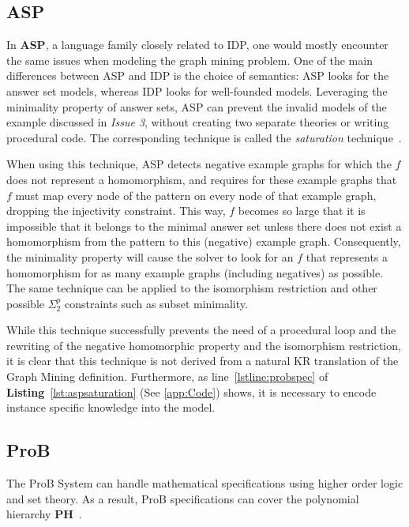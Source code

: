 \subsection{ASP}
In \textbf{ASP}, a language family closely related to IDP, one would mostly encounter the same issues when modeling the graph mining problem.
One of the main differences between ASP and IDP is the choice of semantics: ASP looks for the
answer set models, whereas IDP looks for well-founded models.
Leveraging the minimality property of answer sets, ASP can prevent the invalid models of the example discussed in \textit{Issue 3}, without creating two separate theories or writing procedural code.
The corresponding technique is called the \emph{saturation} technique~\citep{conf/rweb/EiterIK09}.

When using this technique, ASP detects negative example graphs for which the $f$ does not represent a homomorphism, and requires for these example graphs that $f$ must map every node of the pattern on every node of that example graph, dropping the injectivity constraint.
This way, $f$ becomes so large that it is impossible that it belongs to the minimal answer set unless there does not exist a homomorphism from the pattern to this (negative) example graph.
Consequently, the minimality property will cause the solver to look for an $f$ that represents a homomorphism for as many example graphs (including negatives) as possible.
The same technique can be applied to the isomorphism restriction and other possible $\Sigma_{2}^{p}$ constraints such as subset minimality.


While this technique successfully prevents the need of a procedural loop and the rewriting of the negative homomorphic property and the isomorphism restriction, it is clear that this technique is not derived from a natural KR translation of the Graph Mining definition.
Furthermore, as line~\ref{lstline:probspec} of \textbf{Listing}~\ref{lst:aspsaturation} (See \ref{app:Code}) shows, it is necessary to encode instance specific knowledge into the model.

\subsection{ProB} \label{subsection:prob}
The ProB System can handle mathematical specifications using higher order logic and set theory.
As a result, ProB specifications can cover the polynomial hierarchy \textbf{PH}~\citep{DBLP:books/daglib/0095988}.

